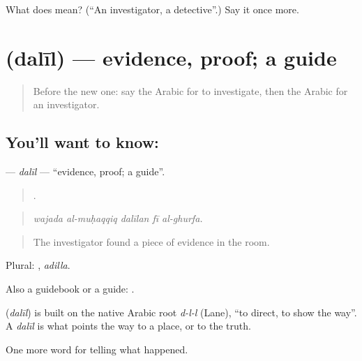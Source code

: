 \begin{tcolorbox}[breakable,colback=teal!4,colframe=teal!35!black,title={Before you move on}]
What does  mean? (\textquotedblleft{}An investigator, a detective\textquotedblright{}.) Say it once more.
\end{tcolorbox}
\section[\texorpdfstring{\ar{دليل} (dalīl)}{دليل (dalīl)}]{ (dalīl) — evidence, proof; a guide}

\label{lesson:AR-C308-dalil}



\begin{quote}
Before the new one: say the Arabic for to investigate, then the Arabic for an investigator.
\end{quote}

\subsection*{You'll want to know: }
\textbf{} — \emph{dalīl} — \textquotedblleft{}evidence, proof; a guide\textquotedblright{}.

\begin{quote}
    .
\end{quote}

\begin{quote}
\emph{wajada al-muḥaqqiq dalīlan fī al-ghurfa.}
\end{quote}

\begin{quote}
The investigator found a piece of evidence in the room.
\end{quote}

Plural: , \emph{adilla}.

Also a guidebook or a guide:  .

\begin{cousinweb}
\textbf{} (\emph{dalīl}) is built on the native Arabic root \emph{d-l-l} (Lane), \textquotedblleft{}to direct, to show the way\textquotedblright{}. A \emph{dalīl} is what points the way to a place, or to the truth.
\end{cousinweb}

\begin{grammarlens}[title={What you've built}]
One more word for telling what happened.
\end{grammarlens}

